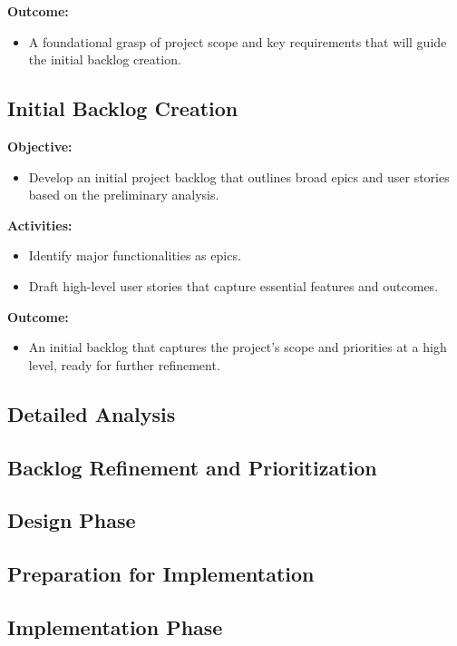 \documentclass[12pt,a4paper]{article}
\begin{document}
\noindent \textbf{Outcome:}
\begin{itemize}
    \item A foundational grasp of project scope and key requirements that will guide the initial backlog creation.
\end{itemize}


\subsection{Initial Backlog Creation}

\noindent \textbf{Objective:}
\begin{itemize}
    \item Develop an initial project backlog that outlines broad epics and user stories based on the preliminary analysis.
\end{itemize}

\noindent \textbf{Activities:}
\begin{itemize}
    \item Identify major functionalities as epics.
    \item Draft high-level user stories that capture essential features and outcomes.
\end{itemize}

\noindent \textbf{Outcome:}
\begin{itemize}
    \item An initial backlog that captures the project's scope and priorities at a high level, ready for further refinement.
\end{itemize}
\subsection{Detailed Analysis}
\subsection{Backlog Refinement and Prioritization}
\subsection{Design Phase}
\subsection{Preparation for Implementation}
\subsection{Implementation Phase}
\end{document}
